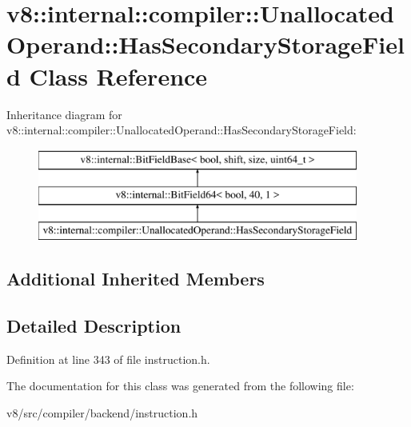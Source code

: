 \hypertarget{classv8_1_1internal_1_1compiler_1_1UnallocatedOperand_1_1HasSecondaryStorageField}{}\section{v8\+:\+:internal\+:\+:compiler\+:\+:Unallocated\+Operand\+:\+:Has\+Secondary\+Storage\+Field Class Reference}
\label{classv8_1_1internal_1_1compiler_1_1UnallocatedOperand_1_1HasSecondaryStorageField}
Inheritance diagram for v8\+:\+:internal\+:\+:compiler\+:\+:Unallocated\+Operand\+:\+:Has\+Secondary\+Storage\+Field\+:\begin{figure}[H]
\begin{center}
\leavevmode
\includegraphics[height=3.000000cm]{classv8_1_1internal_1_1compiler_1_1UnallocatedOperand_1_1HasSecondaryStorageField}
\end{center}
\end{figure}
\subsection*{Additional Inherited Members}


\subsection{Detailed Description}


Definition at line 343 of file instruction.\+h.



The documentation for this class was generated from the following file\+:\begin{DoxyCompactItemize}
\item 
v8/src/compiler/backend/instruction.\+h\end{DoxyCompactItemize}
